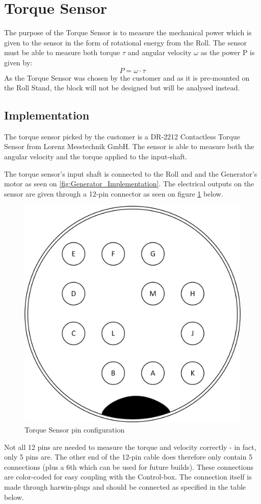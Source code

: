 \newpage
\section{Torque Sensor}
The purpose of the Torque Sensor is to measure the mechanical power which is given to the sensor in the form of rotational energy from the Roll. The sensor must be able to measure both torque $\tau$ and angular velocity $\omega$ as the power P is given by:
\begin{equation}
	P=\omega\cdot\tau
\end{equation}
As the Torque Sensor was chosen by the customer and as it is pre-mounted on the Roll Stand, the block will not be designed but will be analysed instead.

\subsection{Implementation}
The torque sensor picked by the customer is a DR-2212 Contactless Torque Sensor from Lorenz Messtechnik GmbH. The sensor is able to measure both the angular velocity and the torque applied to the input-shaft.

The torque sensor's input shaft is connected to the Roll and and the Generator's motor as seen on \vref{fig:Generator_Implementation}. The electrical outputs on the sensor are given through a 12-pin connector as seen on figure \ref{fig:Torque_pins} below.

\begin{figure}[H]
	\centering
	\includegraphics[width=0.4\linewidth]{Hardware/Pictures/Torque_Sensor_Pins}
	\caption{Torque Sensor pin configuration}
	\label{fig:Torque_pins}
\end{figure}

Not all 12 pins are needed to measure the torque and velocity correctly - in fact, only 5 pins are. The other end of the 12-pin cable does therefore only contain 5 connections (plus a 6th which can be used for future builds). These connections are color-coded for easy coupling with the Control-box. The connection itself is made through harwin-plugs and should be connected as specified in the table below.


